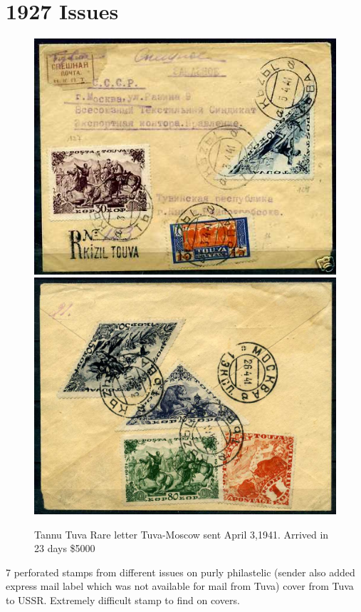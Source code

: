 \section{1927 Issues}

\begin{fullwidth}
\begin{figure}[htp]
\includegraphics[width=.95\textwidth]{../tannu-tuva/1941-letter.jpg}
\includegraphics[width=.95\textwidth]{../tannu-tuva/1941-letter-back.jpg}
\caption{Tannu Tuva  Rare letter Tuva-Moscow sent April 3,1941. Arrived in 23 days \$5000}
\end{figure}
\end{fullwidth}
7 perforated stamps from different issues on purly philastelic (sender also added express mail label which was not available for mail from Tuva) cover from Tuva to USSR. 
Extremely difficult stamp to find on covers.

